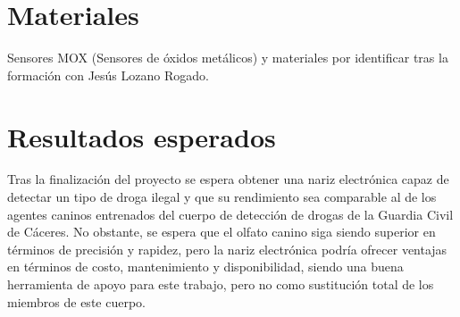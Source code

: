 \documentclass[12pt,a4paper,oneside]{report}
\begin{document}
\section{Materiales}
Sensores MOX (Sensores de óxidos metálicos) y materiales por identificar tras la formación con Jesús Lozano Rogado.

\section{Resultados esperados}
Tras la finalización del proyecto se espera obtener una nariz electrónica capaz de detectar un tipo de droga ilegal y que su rendimiento sea comparable al de los agentes caninos entrenados del cuerpo de detección de drogas de la Guardia Civil de Cáceres.
No obstante, se espera que el olfato canino siga siendo superior en términos de precisión y rapidez, pero la nariz electrónica podría ofrecer ventajas en términos de costo, mantenimiento y disponibilidad, siendo una buena herramienta de apoyo para este trabajo, pero no como sustitución total de los miembros de este cuerpo.
\end{document}
